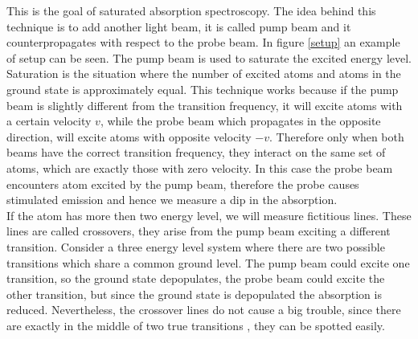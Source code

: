 \documentclass[a4paper,10pt]{article}
\begin{document}
This is the goal of saturated absorption spectroscopy. The idea behind this technique is to add another light beam, it is called pump beam and it counterpropagates with respect to the probe beam. In figure \ref{setup} an example of setup can be seen. The pump beam is used to saturate the excited energy level. Saturation is the situation where the number of excited atoms and atoms in the ground state is approximately equal. This technique works because if the pump beam is slightly different from the transition frequency, it will excite atoms with a certain velocity $v$, while the probe beam which propagates in the opposite direction, will excite atoms with opposite velocity $-v$. Therefore only when both beams have the correct transition frequency, they interact on the same set of atoms, which are exactly those with zero velocity. In this case the probe beam encounters atom excited by the pump beam, therefore the probe causes stimulated emission and hence we measure a dip in the absorption.\\
If the atom has more then two energy level, we will measure fictitious lines. These lines are called crossovers, they arise from the pump beam exciting a different transition. Consider a three energy level system where there are two possible transitions which share a common ground level. The pump beam could excite one transition, so the ground state depopulates, the probe beam could excite the other transition, but since the ground state is depopulated the absorption is reduced. Nevertheless, the crossover lines do not cause a big trouble, since there are exactly in the middle of two true transitions \cite{crossover}, they can be spotted easily.
\end{document}
